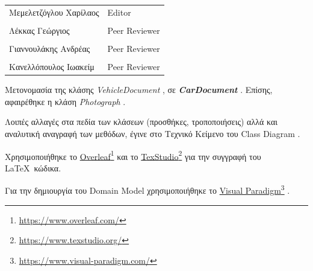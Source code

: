 \documentclass{../ol-softwaremanual}
\newcommand{\doclink}[2]{\href{#1}{#2}\footnote{\url{#1}}}
\begin{document}
	
	\vspace{20pt}
	
	\begin{table}[htbp!]
		\begin{tabular}{ll}
			Μεμελετζόγλου Χαρίλαος & \en Editor \\
			\\ Λέκκας Γεώργιος      &   \en  Peer Reviewer \\
			\\ Γιαννουλάκης Ανδρέας & \en Peer Reviewer \\
			\\ Κανελλόπουλος Ιωακείμ & \en Peer Reviewer \\ 
		\end{tabular}
	\end{table}
	
	
	\vspace{10pt}
	\flushleft
	

	Μετονομασία της κλάσης \en \textit{VehicleDocument} \gr, σε \en \textbf{\textit{CarDocument}} \gr.	Επίσης, αφαιρέθηκε η κλάση \en \textit{Photograph} \gr.	 \break
	
	Λοιπές αλλαγές στα πεδία των κλάσεων (προσθήκες, τροποποιήσεις) αλλά και αναλυτική αναγραφή των μεθόδων, έγινε στο Τεχνικό Κείμενο του \en Class Diagram \gr. \break

	
	
	\newpage 
	
	
	
	\vspace{20pt}
	\flushleft
	Χρησιμοποιήθηκε το \en \doclink{https://www.overleaf.com/}{Overleaf} \gr και το \en \doclink{https://www.texstudio.org/}{TexStudio} \gr για την συγγραφή του \LaTeX\ κώδικα. \break
	
	Για την δημιουργία του \en Domain Model \gr χρησιμοποιήθηκε το \en \doclink{https://www.visual-paradigm.com/}{Visual Paradigm} \gr .
	
	\newpage
	
	
\end{document}
